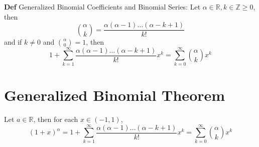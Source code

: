 \documentclass[11pt,notitlepage]{report}
\begin{document}
\textbf{Def} Generalized Binomial Coefficients and Binomial Series: Let $\alpha \in \mathbb R, k \in \mathbb Z \geq 0$, then
$$\binom{\alpha}{k} = \frac{\alpha(\alpha-1)\dots(\alpha-k+1)}{k!}$$ and if $k \ne 0$ and $\binom{\alpha}{0} = 1$, then
$$1 + \sum_{k=1}^\infty \frac{\alpha(\alpha-1)\dots(\alpha-k+1)}{k!}x^k = \sum_{k=0}^\infty \binom{\alpha}{k}x^k$$

\section*{Generalized Binomial Theorem}Let $a \in \mathbb R$, then for each $x \in (-1, 1)$,
$$(1+x)^\alpha = 1 + \sum_{k=1}^\infty \frac{\alpha(\alpha-1)\dots(\alpha-k+1)}{k!} x^k = \sum_{k=0}^\infty \binom{\alpha}{k} x^k$$
\end{document}
